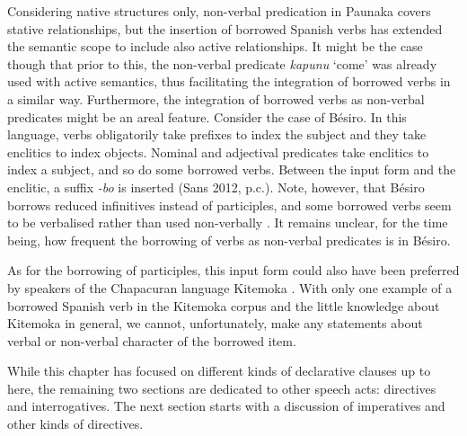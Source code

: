 Considering native structures only, non-verbal predication in Paunaka covers stative relationships, but the insertion of borrowed Spanish verbs has extended the semantic scope to include also active relationships. It might be the case though that prior to this, the non-verbal predicate \textit{kapunu} ‘come’ was already used with active semantics, thus facilitating the integration of borrowed verbs in a similar way. Furthermore, the integration of borrowed verbs as non-verbal predicates might be an areal feature. Consider the case of Bésiro. In this language, verbs obligatorily take prefixes to index the subject and they take enclitics to index objects. Nominal and adjectival predicates take enclitics to index a subject, and so do some borrowed verbs. Between the input form and the enclitic, a suffix \textit{-bo} is inserted (Sans 2012, p.c.). Note, however, that Bésiro borrows reduced infinitives instead of participles, and some borrowed verbs seem to be verbalised rather than used non-verbally \citep[cf. Bésiro texts in][47--70]{Sans2013}. It remains unclear, for the time being, how frequent the borrowing of verbs as non-verbal predicates is in Bésiro.

As for the borrowing of participles, this input form could also have been preferred by speakers of the Chapacuran language Kitemoka \citep[cf. ex. KIT1 739 in][96]{Wienold2012}. With only one example of a borrowed Spanish verb in the Kitemoka corpus and the little knowledge about Kitemoka in general, we cannot, unfortunately, make any statements about verbal or non-verbal character of the borrowed item.

While this chapter has focused on different kinds of declarative clauses up to here, the remaining two sections are dedicated to other speech acts: directives and interrogatives. The next section starts with a discussion of imperatives and other kinds of directives.


